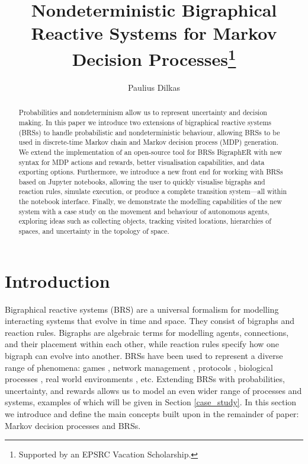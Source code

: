 \documentclass[runningheads]{llncs}
\begin{document}
\title{Nondeterministic Bigraphical Reactive Systems for Markov Decision
  Processes\thanks{Supported by an EPSRC Vacation Scholarship.}}
\author{Paulius Dilkas}
\maketitle

\begin{abstract}
  Probabilities and nondeterminism allow us to represent uncertainty and
  decision making. In this paper we introduce two extensions of bigraphical
  reactive systems (BRSs) to handle probabilistic and nondeterministic
  behaviour, allowing BRSs to be used in discrete-time Markov chain and Markov
  decision process (MDP) generation. We extend the implementation of an
  open-source tool for BRSs BigraphER with new syntax for MDP actions and
  rewards, better visualisation capabilities, and data exporting options.
  Furthermore, we introduce a new front end for working with BRSs based on
  Jupyter notebooks, allowing the user to quickly visualise bigraphs and
  reaction rules, simulate execution, or produce a complete transition
  system---all within the notebook interface. Finally, we demonstrate the
  modelling capabilities of the new system with a case study on the movement and
  behaviour of autonomous agents, exploring ideas such as collecting objects,
  tracking visited locations, hierarchies of spaces, and uncertainty in the
  topology of space.

\end{abstract}

\section{Introduction}

Bigraphical reactive systems (BRS) \cite{DBLP:books/daglib/0022395} are a
universal formalism for modelling interacting systems that evolve in time and
space. They consist of bigraphs and reaction rules. Bigraphs are algebraic terms
for modelling agents, connections, and their placement within each other, while
reaction rules specify how one bigraph can evolve into another. BRSs have
been used to represent a diverse range of phenomena: games
\cite{DBLP:journals/tochi/BenfordCRS16}, network management
\cite{DBLP:journals/scp/CalderKSS14}, protocols
\cite{DBLP:journals/fac/CalderS14}, biological processes
\cite{DBLP:journals/entcs/KrivineMT08}, real world environments
\cite{DBLP:conf/giscience/WaltonW12}, etc. Extending BRSs with probabilities,
uncertainty, and rewards allows us to model an even wider range of processes and
systems, examples of which will be given in Section \ref{case_study}. In this
section we introduce and define the main concepts built upon in the remainder of
paper: Markov decision processes and BRSs.
\end{document}
